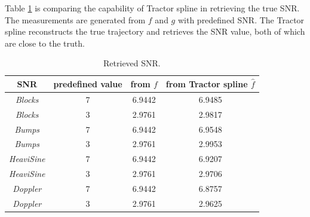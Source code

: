 Table \ref{tablecompareSNR} is comparing the capability of Tractor spline in retrieving the true SNR. The measurements are generated from $f$ and $g$ with predefined SNR. The Tractor spline reconstructs the true trajectory and retrieves the SNR value, both of which are close to the truth. 

\begin{table}
	\centering
	\caption{Retrieved SNR.}\label{tablecompareSNR}
	\setlength\tabcolsep{1.5pt}
	\begin{tabular}{|c|c|c|c|}
\hline	         SNR              & predefined  value & from $f$ & from Tractor spline $\hat{f}$ \\ \hline
		\textit{Blocks}    & 7   & 6.9442    &  6.9485     \\ \hline
		\textit{Blocks}    & 3   &  2.9761   &  2.9817   \\ \hline
		\textit{Bumps}     & 7  & 6.9442    &  6.9548  \\ \hline
		\textit{Bumps}     & 3  & 2.9761    &   2.9953 	   \\ \hline
		\textit{HeaviSine} & 7 & 6.9442    &   6.9207   \\ \hline
		\textit{HeaviSine} & 3 & 2.9761    &   2.9706  \\ \hline
		\textit{Doppler}   & 7   & 6.9442   &  6.8757   \\ \hline
		\textit{Doppler}   & 3   & 2.9761   &  2.9625   \\ \hline
	\end{tabular}	
\end{table}


